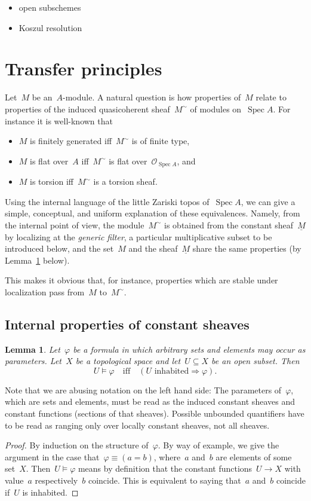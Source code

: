 \documentclass[10pt]{amsart}
\theoremstyle{definition}
\theoremstyle{plain}
\newtheorem{lemma}[defn]{Lemma}
\theoremstyle{remark}
\renewcommand{\O}{\mathcal{O}}
\newcommand{\ul}[1]{\underline{#1}}
\DeclareMathOperator{\Spec}{Spec}
\newcommand{\?}{\,{:}\,}
\renewcommand{\_}{\mathpunct{.}\,}
\begin{document}
\begin{itemize}
\item open subschemes
\item Koszul resolution
\end{itemize}


\section{Transfer principles}

Let~$M$ be an~$A$-module. A natural question is how properties of~$M$
relate to properties of the induced quasicoherent sheaf~$M^\sim$ of modules
on~$\Spec A$. For instance it is well-known that
\begin{itemize}
\item $M$ is finitely generated iff~$M^\sim$ is of finite type,
\item $M$ is flat over~$A$ iff~$M^\sim$ is flat over~$\O_{\Spec A}$, and
\item $M$ is torsion iff~$M^\sim$ is a torsion sheaf.
\end{itemize}
Using the internal language of the little Zariski topos of~$\Spec A$, we can
give a simple, conceptual, and uniform explanation of these equivalences.
Namely, from the internal point of view, the module~$M^\sim$ is obtained from
the constant sheaf~$\ul{M}$ by localizing at the \emph{generic filter}, a
particular multiplicative subset to be introduced below, and the set~$M$ and
the sheaf~$\ul{M}$ share the same properties (by
Lemma~\ref{lemma:properties-of-constant-sheaves} below).

This makes it obvious that, for instance, properties which are stable under
localization pass from~$M$ to~$M^\sim$.


\subsection{Internal properties of constant sheaves}

\begin{lemma}\label{lemma:properties-of-constant-sheaves}Let~$\varphi$ be a
formula in which arbitrary sets and elements may occur as parameters. Let~$X$
be a topological space and let~$U \subseteq X$ be an open subset. Then
\[ U \models \varphi \quad\text{iff}\quad (\text{$U$ inhabited} \Rightarrow
\varphi). \]
\end{lemma}
Note that we are abusing notation on the left hand side: The parameters
of~$\varphi$, which are sets and elements, must be read as the induced constant
sheaves and constant functions (sections of that sheaves). Possible
unbounded quantifiers have to be read as ranging only over locally constant
sheaves, not all sheaves.
\begin{proof}By induction on the structure of~$\varphi$. By way of example, we
give the argument in the case that~$\varphi \equiv (a = b)$, where~$a$ and~$b$ are
elements of some set~$X$. Then~$U \models \varphi$ means by definition that the
constant functions~$U \to X$ with value~$a$ respectively~$b$ coincide. This is
equivalent to saying that~$a$ and~$b$ coincide if~$U$ is inhabited.
\end{proof}
\end{document}
